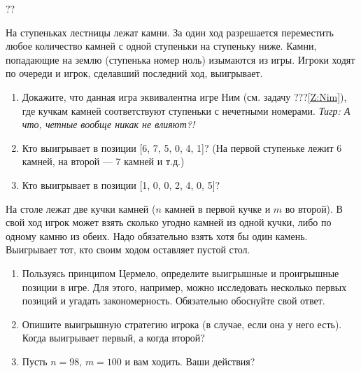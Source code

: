 \begin{problem}\par
\begin{source} \cite{sprague:uz}??\end{source}
На ступеньках лестницы лежат камни. За один ход разрешается переместить любое количество камней с одной ступеньки на ступеньку ниже. Камни, попадающие на землю (ступенька номер ноль) изымаются из игры. Игроки ходят по очереди и игрок, сделавший последний ход, выигрывает.\par
\begin{enumerate}
\item 	Докажите, что данная игра эквивалентна игре Ним (см. задачу  {\red ???}\ref{Z:Nim}), где кучкам камней соответствуют ступеньки с нечетными номерами. {\it Тигр: А что, четные вообще никак не влияют?!}\par
\item 	Кто выигрывает в позиции [6, 7, 5, 0, 4, 1]? (На первой ступеньке лежит 6 камней, на второй — 7 камней и т.д.)\par
\item 	Кто выигрывает в позиции [1, 0, 0, 2, 4, 0, 5]?\par
\end{enumerate}


\begin{sol}

\end{sol}
\end{problem}

\begin{problem}
\begin{source}
\cite{savva:nmu}
\end{source}
  На столе лежат две кучки камней ($n$ камней в первой кучке и $m$ во второй). В свой ход игрок может взять сколько угодно камней из одной кучки, либо по одному камню из обеих. Надо обязательно взять хотя бы один камень. Выигрывает тот, кто своим ходом оставляет пустой стол.
\begin{enumerate}
\item Пользуясь принципом Цермело, определите выигрышные и проигрышные позиции в игре. Для этого, например, можно исследовать несколько первых позиций и угадать закономерность. Обязательно обоснуйте свой ответ.
\item Опишите выигрышную стратегию игрока (в случае, если она у него есть). Когда выигрывает первый, а когда второй?
\item Пусть $n = 98$, $m=100$ и вам ходить. Ваши действия?
\end{enumerate}






\begin{sol}

\end{sol}
\end{problem}



